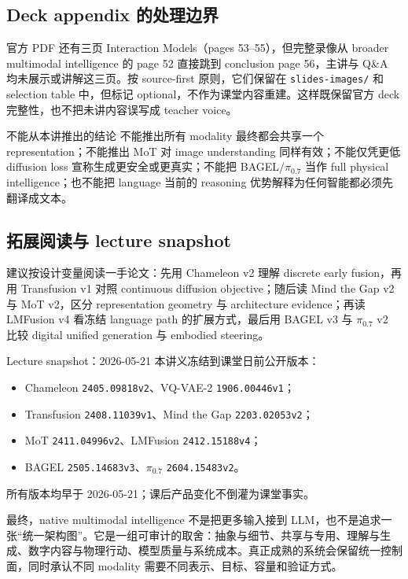 \documentclass[a4paper]{article}
\begin{document}
\subsection{Deck appendix 的处理边界}

官方 PDF 还有三页 Interaction Models（pages 53--55），但完整录像从 broader multimodal intelligence 的 page 52 直接跳到 conclusion page 56，主讲与 Q\&A 均未展示或讲解这三页。按 source-first 原则，它们保留在 \texttt{slides-images/} 和 selection table 中，但标记 optional，不作为课堂内容重建。这样既保留官方 deck 完整性，也不把未讲内容误写成 teacher voice。

\begin{warningbox}{不能从本讲推出的结论}
不能推出所有 modality 最终都会共享一个 representation；不能推出 MoT 对 image understanding 同样有效；不能仅凭更低 diffusion loss 宣称生成更安全或更真实；不能把 BAGEL/$\pi_{0.7}$ 当作 full physical intelligence；也不能把 language 当前的 reasoning 优势解释为任何智能都必须先翻译成文本。
\end{warningbox}

\subsection{拓展阅读与 lecture snapshot}

建议按设计变量阅读一手论文：先用 Chameleon v2 理解 discrete early fusion，再用 Transfusion v1 对照 continuous diffusion objective；随后读 Mind the Gap v2 与 MoT v2，区分 representation geometry 与 architecture evidence；再读 LMFusion v4 看冻结 language path 的扩展方式，最后用 BAGEL v3 与 $\pi_{0.7}$ v2 比较 digital unified generation 与 embodied steering。

\begin{knowledgebox}{Lecture snapshot：2026-05-21}
本讲义冻结到课堂日前公开版本：
\begin{itemize}
  \item Chameleon \texttt{2405.09818v2}、VQ-VAE-2 \texttt{1906.00446v1}；
  \item Transfusion \texttt{2408.11039v1}、Mind the Gap \texttt{2203.02053v2}；
  \item MoT \texttt{2411.04996v2}、LMFusion \texttt{2412.15188v4}；
  \item BAGEL \texttt{2505.14683v3}、$\pi_{0.7}$ \texttt{2604.15483v2}。
\end{itemize}
所有版本均早于 2026-05-21；课后产品变化不倒灌为课堂事实。
\end{knowledgebox}

最终，native multimodal intelligence 不是把更多输入接到 LLM，也不是追求一张“统一架构图”。它是一组可审计的取舍：抽象与细节、共享与专用、理解与生成、数字内容与物理行动、模型质量与系统成本。真正成熟的系统会保留统一控制面，同时承认不同 modality 需要不同表示、目标、容量和验证方式。
\end{document}
